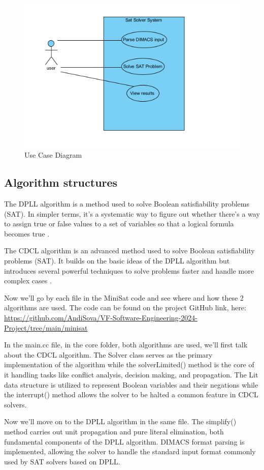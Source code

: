 \documentclass[runningheads]{llncs}
\begin{document}
\begin{figure}
    \centering
    \includegraphics[width=0.67\linewidth]{usecase.png}
    \caption{Use Case Diagram}
    \label{fig: Use Case Diagram}
\end{figure}

\subsection{Algorithm structures}\label{Algorithm structures}

The \ac{DPLL} algorithm is a method used to solve Boolean satisfiability problems (SAT). In simpler terms, it’s a systematic way to figure out whether there’s a way to assign true or false values to a set of variables so that a logical formula becomes true \cite{DPLL}.

The \ac{CDCL} algorithm is an advanced method used to solve Boolean satisfiability problems (SAT). It builds on the basic ideas of the \ac{DPLL} algorithm but introduces several powerful techniques to solve problems faster and handle more complex cases \cite{CDCL}.

Now we'll go by each file in the MiniSat code and see where and how these 2 algorithms are used. The code can be found on the project GitHub link, here: \url{https://github.com/AndiSova/VF-Software-Engineering-2024-Project/tree/main/minisat}

In the main.cc file, in the core folder, both algorithms are used, we'll first talk about the \ac{CDCL} algorithm. The Solver class serves as the primary implementation of the algorithm while the solverLimited() method is the core of it handling tasks like conflict analysis, decision making, and propagation.
The Lit data structure is utilized to represent Boolean variables and their negations while the interrupt() method allows the solver to be halted a common feature in \ac{CDCL} solvers.

Now we'll move on to the \ac{DPLL} algorithm in the same file.
The simplify() method carries out unit propagation and pure literal elimination, both fundamental components of the \ac{DPLL} algorithm.
DIMACS format parsing is implemented, allowing the solver to handle the standard input format commonly used by \ac{SAT} solvers based on \ac{DPLL}.
\end{document}
